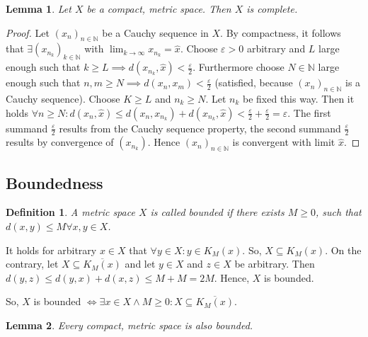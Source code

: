 \documentclass{article}
\newtheorem{definition}{Definition}  \numberwithin{definition}{section}
\newtheorem{lemma}{Lemma}  \numberwithin{lemma}{section}
\begin{document}
\begin{lemma} %
  Let $X$ be a compact, metric space. Then $X$ is complete.
\end{lemma}
\begin{proof}
  Let $(x_n)_{n\in\mathbb N}$ be a Cauchy sequence in $X$. By compactness, it follows that
  $\exists (x_{n_k})_{k \in \mathbb N}$ with $\lim_{k\to\infty} x_{n_k} = \hat{x}$.
  Choose $\varepsilon > 0$ arbitrary and $L$ large enough such that $k \geq L \implies d(x_{n_k}, \hat{x}) < \frac\varepsilon2$. Furthermore choose $N \in \mathbb N$ large enough such that $n,m \geq N \implies d(x_n, x_m) < \frac\varepsilon2$ (satisfied, because $(x_n)_{n \in \mathbb N}$ is a Cauchy sequence).
  Choose $K \geq L$ and $n_k \geq N$. Let $n_k$ be fixed this way.
  Then it holds $\forall n \geq N: d(x_n, \hat{x}) \leq d(x_n, x_{n_k}) + d(x_{n_k}, \hat{x}) < \frac\varepsilon2 + \frac\varepsilon2 = \varepsilon$. The first summand $\frac\varepsilon2$ results from the Cauchy sequence property, the second summand $\frac\varepsilon2$ results by convergence of $(x_{n_k})$. Hence $(x_n)_{n\in\mathbb N}$ is convergent with limit $\hat{x}$.
\end{proof}

\subsection{Boundedness}
\begin{definition} %
  A metric space $X$ is called \emph{bounded} if there exists $M \geq 0$, such that $d(x,y) \leq M \forall x,y \in X$.
\end{definition}
It holds for arbitrary $x \in X$ that $\forall y \in X: y \in K_M(x)$.
So, $X \subseteq K_M(x)$.
On the contrary, let $X \subseteq \overline{K_M(x)}$ and let $y \in X$ and $z \in X$ be arbitrary. Then $d(y, z) \leq d(y, x) + d(x, z) \leq M + M = 2M$. Hence, $X$ is bounded.

So, $X$ is bounded $\iff \exists x \in X \land M \geq 0: X \subseteq \overline{K_M(x)}$.

\begin{lemma} %
  Every compact, metric space is also bounded.
\end{lemma}
\end{document}
